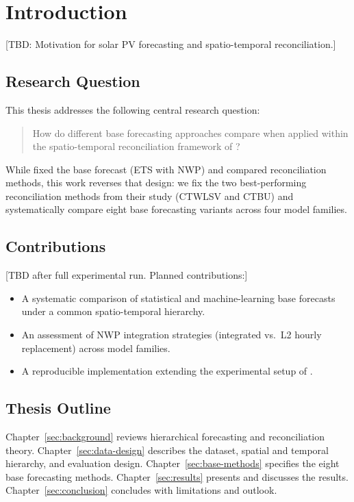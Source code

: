 \section{Introduction}\label{sec:introduction}

[TBD: Motivation for solar PV forecasting and spatio-temporal reconciliation.]

\subsection{Research Question}\label{sec:research-question}

This thesis addresses the following central research question:

\begin{quote}
    How do different base forecasting approaches compare when applied within the spatio-temporal reconciliation framework of \citet{difonzo2023spatiotemporal}?
\end{quote}

While \citet{difonzo2023spatiotemporal} fixed the base forecast (ETS with NWP) and compared reconciliation methods, this work reverses that design: we fix the two best-performing reconciliation methods from their study (CTWLSV and CTBU) and systematically compare eight base forecasting variants across four model families.

\subsection{Contributions}\label{sec:contributions}

[TBD after full experimental run. Planned contributions:]
\begin{itemize}
    \item A systematic comparison of statistical and machine-learning base forecasts under a common spatio-temporal hierarchy.
    \item An assessment of NWP integration strategies (integrated vs.\ L2 hourly replacement) across model families.
    \item A reproducible implementation extending the experimental setup of \citet{difonzo2023spatiotemporal}.
\end{itemize}

\subsection{Thesis Outline}\label{sec:outline}

Chapter~\ref{sec:background} reviews hierarchical forecasting and reconciliation theory.
Chapter~\ref{sec:data-design} describes the dataset, spatial and temporal hierarchy, and evaluation design.
Chapter~\ref{sec:base-methods} specifies the eight base forecasting methods.
Chapter~\ref{sec:results} presents and discusses the results.
Chapter~\ref{sec:conclusion} concludes with limitations and outlook.
